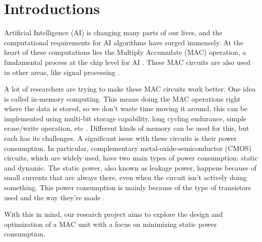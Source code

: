 \section{Introductions}

Artificial Intelligence (AI) is changing many parts of our lives, and the computational requirements for AI algorithms have surged immensely.  At the heart of these computations lies the Multiply Accumulate (MAC) operation, a fundamental process at the chip level for AI \cite{wang_2021_an}. These MAC circuits are also used in other areas, like signal processing \cite{ntnudepartmentofelectronicsystems_2023_project}.

A lot of researchers are trying to make these MAC circuits work better. One idea is called in-memory computing. This means doing the MAC operations right where the data is stored, so we don't waste time moving it around, this can be implemented using multi-bit storage capability, long cycling endurance, simple erase/write operation, etc \cite{wang_2021_an}. Different kinds of memory can be used for this, but each has its challenges. A significant issue with these circuits is their power consumption. In particular, complementary metal-oxide-semiconductor (CMOS) circuits, which are widely used, have two main types of power consumption: static and dynamic. The static power, also known as leakage power, happens because of small currents that are always there, even when the circuit isn't actively doing something. This power consumption is mainly because of the type of transistors used and the way they're made \cite{beloglazov_2011_advances}.

With this in mind, our research project aims to explore the design and optimization of a MAC unit with a focus on minimizing static power consumption.